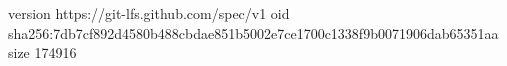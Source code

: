 version https://git-lfs.github.com/spec/v1
oid sha256:7db7cf892d4580b488cbdae851b5002e7ce1700c1338f9b0071906dab65351aa
size 174916
